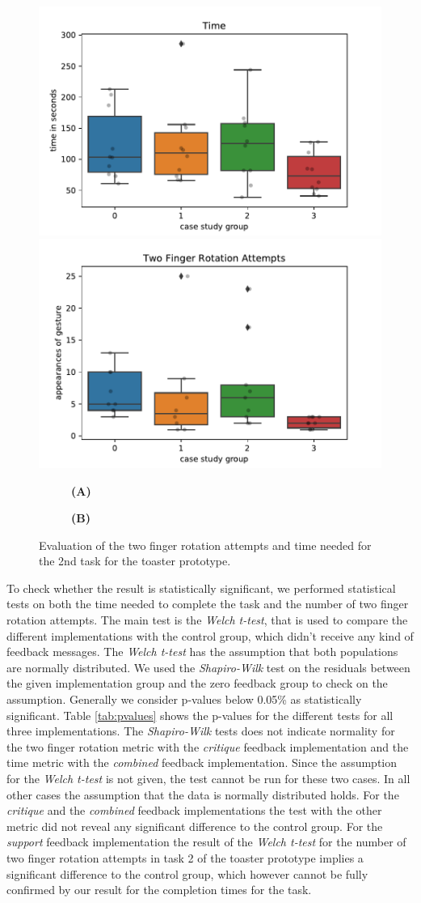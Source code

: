 \documentclass[11pt, a4paper]{article}
\begin{document}
			\begin{figure}[H]
				\centering
				\includegraphics[width=.49\textwidth]{img/plot/plot_bplot_time.pdf}
				\includegraphics[width=.49\textwidth]{img/plot/plot_bplot_tfr.pdf}
				\begin{subfigure}[t]{.49\textwidth}\centering
					\textbf{(A)}
				\end{subfigure}
				\begin{subfigure}[t]{.49\textwidth}\centering
					\textbf{(B)}
				\end{subfigure}
				\caption{Evaluation of the two finger rotation attempts and time needed for the 2nd task for the toaster prototype.}
				\label{fig:t2_metrics}
			\end{figure}

			To check whether the result is statistically significant, we performed statistical tests on both the time needed to complete the task and the number of two finger rotation attempts. The main test is the \emph{Welch t-test}, that is used to compare the different implementations with the control group, which didn't receive any kind of feedback messages. The \emph{Welch t-test} has the assumption that both populations are normally distributed. We used the \emph{Shapiro-Wilk} test on the residuals between the given implementation group and the zero feedback group to check on the assumption. Generally we consider p-values below 0.05\% as statistically significant. Table \ref{tab:pvalues} shows the p-values for the different tests for all three implementations. The \emph{Shapiro-Wilk} tests does not indicate normality for the two finger rotation metric with the \emph{critique} feedback implementation and the time metric with the \emph{combined} feedback implementation. Since the assumption for the \emph{Welch t-test} is not given, the test cannot be run for these two cases. In all other cases the assumption that the data is normally distributed holds. For the \emph{critique} and the \emph{combined} feedback implementations the test with the other metric did not reveal any significant difference to the control group. For the \emph{support} feedback implementation the result of the \emph{Welch t-test} for the number of two finger rotation attempts in task 2 of the toaster prototype implies a significant difference to the control group, which however cannot be fully confirmed by our result for the completion times for the task.
\end{document}
